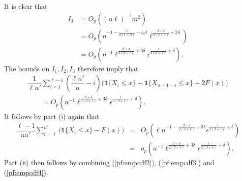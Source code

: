 \documentclass[a4paper, 12pt]{article}
\theoremstyle{plain}
\theoremstyle{definition}
\begin{document}
It is clear that
\begin{align*}
I_3&=O_p\left((n\ell)^{-1}m^2\right) \\
&=O_p\left(
n^{-1-\frac{c_0}{2(1+\beta)}-c_0\delta}\ell^{\frac{\beta+3}{2(\beta+1)}+3\delta}\right) \\
&=O_p\left(n^{-1}\ell^{\frac{\beta+3}{2(\beta+1)}+3\delta}
\epsilon^{\frac{1}{2(\beta+1)}+\delta}\right).
\end{align*}
The bounds on $I_1,I_2,I_3$ therefore imply that
\begin{equation}
\begin{split}
\dfrac{1}{\ell n'}\sum_{i=1}^{\ell-1}
\left(\dfrac{\ell n'}{n}-i\right)\big(\pmb{1}\{X_i\le x\}
+\pmb{1}\{X_{n+1-i}\le x\}-2F(x)\big)\\
\qquad=O_p\left(n^{-1}\ell^{\frac{\beta+3}{2(\beta+1)}+3\delta}
\epsilon^{\frac{1}{2(\beta+1)}+\delta}\right).
\end{split}
\label{pf:empcdf3}
\end{equation}
It follows by part (i) again that
\begin{eqnarray}
\dfrac{\ell-1}{nn'}\sum_{i=\ell}^{n'}\big(\pmb{1}\{X_{i}\le x\}-F(x)\big)
&=&O_p\left(\ell n^{-1-\,\frac{\beta-1}{2(\beta+1)}+3\delta}
\epsilon^{\frac{1}{2(\beta+1)}+\delta}\right)\nonumber\\
&=&o_p\left(n^{-1}\ell^{\frac{\beta+3}{2(\beta+1)}+3\delta}
\epsilon^{\frac{1}{2(\beta+1)}+\delta}\right).
\label{pf:empcdf4}
\end{eqnarray}
Part (ii) then follows by combining (\ref{pf:empcdf2}), (\ref{pf:empcdf3}) and (\ref{pf:empcdf4}).
\end{document}
